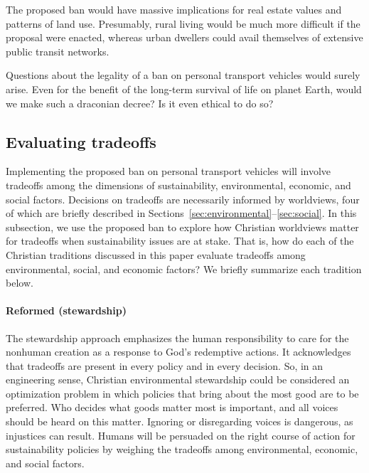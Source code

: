 \documentclass[12pt]{article}
\begin{document}
The proposed ban would have massive implications for real estate values 
and patterns of land use. 
Presumably, rural living would be much more difficult if the proposal were enacted,
whereas urban dwellers could avail themselves of extensive public transit networks.

Questions about the legality of a ban on personal transport vehicles would surely arise.  
Even for the benefit of the long-term survival of life on planet Earth,
would we make such a draconian decree? 
Is it even ethical to do so?


\subsection{Evaluating tradeoffs}
\label{sec:evaluating_tradeoffs}

Implementing the proposed ban on personal transport vehicles
will involve tradeoffs among the dimensions of sustainability, 
environmental, economic, and social factors.
Decisions on tradeoffs are necessarily informed by worldviews,
four of which are briefly described 
in Sections~\ref{sec:environmental}--\ref{sec:social}.
In this subsection, 
we use the proposed ban to explore how Christian worldviews matter 
for tradeoffs when sustainability issues are at stake.
That is, how do each of the Christian traditions discussed in this paper 
evaluate tradeoffs among environmental, social, and economic factors?
We briefly summarize each tradition below.

\paragraph{Reformed (stewardship)} 

The stewardship approach emphasizes the human responsibility 
to care for the nonhuman creation
as a response to God's redemptive actions.
It acknowledges that tradeoffs 
are present in every policy and in every decision. 
So, in an engineering sense, 
Christian environmental stewardship could be considered an optimization problem
in which policies that bring about the most good 
are to be preferred.
Who decides what goods matter most is important, and 
all voices should be heard on this matter.
Ignoring or disregarding voices is dangerous,
as injustices can result. 
Humans will be persuaded on the right course of action
for sustainability policies by weighing the tradeoffs 
among environmental, economic, and social factors.
\end{document}
